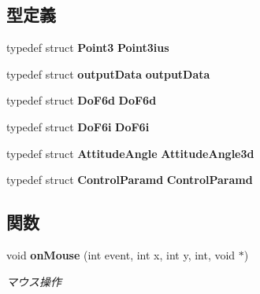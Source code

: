 \subsection*{型定義}
\begin{DoxyCompactItemize}
\item 
typedef struct {\bf Point3} {\bf Point3ius}
\item 
typedef struct {\bf output\-Data} {\bf output\-Data}
\item 
typedef struct {\bf Do\-F6d} {\bf Do\-F6d}
\item 
typedef struct {\bf Do\-F6i} {\bf Do\-F6i}
\item 
typedef struct {\bf Attitude\-Angle} {\bf Attitude\-Angle3d}
\item 
typedef struct {\bf Control\-Paramd} {\bf Control\-Paramd}
\end{DoxyCompactItemize}
\subsection*{関数}
\begin{DoxyCompactItemize}
\item 
void {\bf on\-Mouse} (int event, int x, int y, int, void $\ast$)
\begin{DoxyCompactList}\small\item\em マウス操作 \end{DoxyCompactList}\end{DoxyCompactItemize}

